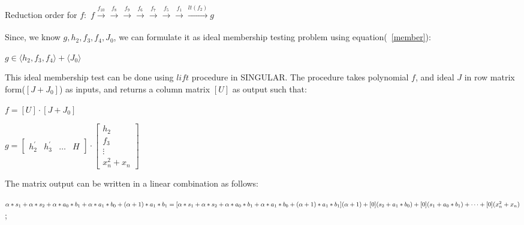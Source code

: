 \begin{Example}
\begin{small}
\end{small}
Reduction order for $f:$
$f\xrightarrow[]{f_{10}}\xrightarrow[]{f_8}\xrightarrow[]{f_9}\xrightarrow[]{f_6}\xrightarrow[]{f_7}\xrightarrow[]{f_5}\xrightarrow[]{f_1}\xrightarrow[]{lt(f_2)}g$

Since, we know $g,h_2,f_3,f_4,J_0$, we can formulate it as ideal membership testing problem using equation(~\ref{member}):
\begin{center}
$g \in \langle h_2,f_3,f_4\rangle + \langle J_0\rangle$
\end{center}

This ideal membership test can be done using $lift$ procedure in SINGULAR. The procedure takes polynomial $f$, and ideal $J$ in row matrix form($[J+J_0]$) as inputs, and returns a column matrix $[U]$ as output such that:
\begin{small}
$f = [U]\cdot [J+J_0]$
\end{small}

\begin{small}
$g = \begin{bmatrix} h_2^{'} & h_3^{'} & \dots & H \end{bmatrix} \cdot 
    \begin{bmatrix} h_2 \\ f_3 \\ \vdots \\ x_n^2 + x_n \end{bmatrix}$
\end{small}

The matrix output can be written in a linear combination as follows: 
\begin{small}
$\alpha*s_1+\alpha*s_2+\alpha*a_0*b_1+\alpha*a_1*b_0+(\alpha+1)*a_1*b_1 = [\alpha*s_1+\alpha*s_2+\alpha*a_0*b_1+\alpha*a_1*b_0+(\alpha+1)*a_1*b_1](\alpha+1) + [0](s_2 + a_1*b_0) + [0](s_1 + a_0*b_1) + \dots + [0](x_n^2 + x_n)$;
\end{small}


\end{Example}

